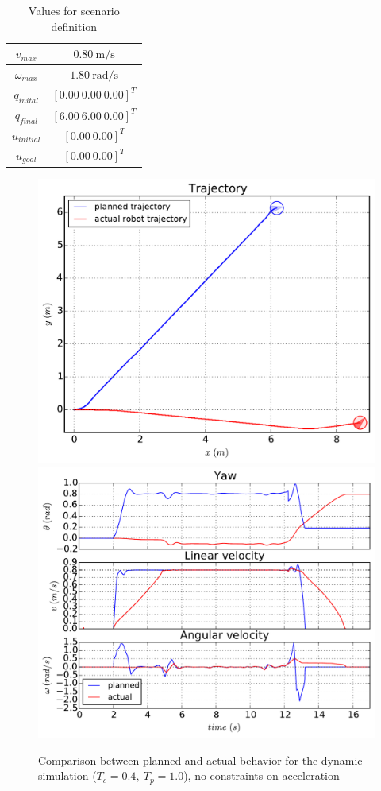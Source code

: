 \begin{table}[H]
\caption {Values for scenario definition} \label{tab:xdesimin}
\begin{center}
\begin{tabular}{|c|c|}
\hline
$v_{max}$ & $0.80\ \mathrm{m/s}$\\
\hline
$\omega_{max}$ & $1.80\ \mathrm{rad/s}$\\
\hline
$q_{inital}$ & $[0.00\ 0.00\ 0.00]^T$\\
\hline
$q_{final}$ & $[6.00\ 6.00\ 0.00]^T$\\
\hline
$u_{initial}$ & $[0.00\ 0.00]^T$\\
\hline
$u_{goal}$ & $[0.00\ 0.00]^T$\\
\hline
\end{tabular}
\end{center}
\end{table}

\begin{figure}[H]\centering
  \includegraphics[width=.49\textwidth]{./images/xde/PLOT_no_acc/dy_path.pdf}
  \includegraphics[width=.49\textwidth]{./images/xde/PLOT_no_acc/dy_vw.pdf}
  \caption{Comparison between planned and actual behavior for the dynamic simulation ($T_c = 0.4,\ T_p = 1.0$), no constraints on acceleration\label{fig:xde1}}
\end{figure}

